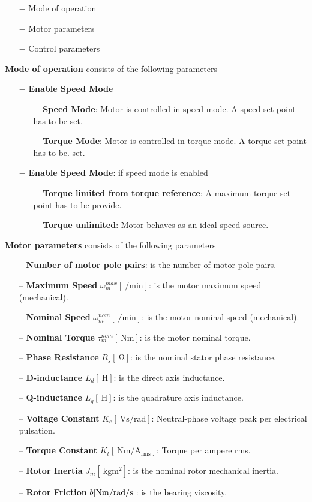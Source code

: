 \documentclass[11pt,a4paper]{article}
\numberwithin{equation}{section}
\theoremstyle{it}
\theoremstyle{definition}
\begin{document}
\begin{onehalfspace}
\begin{itemize}
	\item[$-$] Mode of operation
	\item[$-$] Motor parameters
	\item[$-$] Control parameters
\end{itemize} 

\textbf{Mode of operation} consists of the following parameters
\begin{itemize}
	\item[$-$] \textbf{Enable Speed Mode}
	\begin{itemize}
		\item[$-$] \textbf{Speed Mode}: Motor is controlled in speed mode. A speed set-point has to be set.
		\item[$-$] \textbf{Torque Mode}: Motor is controlled in torque mode. A torque set-point has to be. set.		
	\end{itemize}
	\item[$-$] \textbf{Enable Speed Mode}: if speed mode is enabled
		\begin{itemize}
			\item[$-$] \textbf{Torque limited from torque reference}: A maximum torque set-point has to be provide.
			\item[$-$] \textbf{Torque unlimited}: Motor behaves as an ideal speed source.
		\end{itemize}
\end{itemize}

\textbf{Motor parameters} consists of the following parameters
\begin{itemize}
	\item[--] \textbf{Number of motor pole pairs}: is the number of motor pole pairs.
	\item[--] \textbf{Maximum Speed} $\omega_m^{max}[\SI{}{\per\minute}]$: is the motor maximum speed (mechanical).	\item[--] \textbf{Nominal Speed} $\omega_m^{nom}[\SI{}{\per\minute}]$: is the motor nominal speed (mechanical).
	\item[--] \textbf{Nominal Torque} $\tau_m^{nom}[\SI{}{\newton\meter}]$: is the motor nominal torque.
	\item[--] \textbf{Phase Resistance} $R_{s}[\SI{}{\ohm}]$: is the nominal stator phase resistance.
	\item[--] \textbf{D-inductance} $L_{d}[\SI{}{\henry}]$: is the direct axis inductance.
	\item[--] \textbf{Q-inductance} $L_{q}[\SI{}{\henry}]$: is the quadrature axis inductance.
	\item[--] \textbf{Voltage Constant} $K_e[\SI{ }{\volt\second\per\radian}]$: Neutral-phase voltage peak per electrical pulsation.
	\item[--] \textbf{Torque Constant} $K_t[\SI{ }{\newton\meter\per\ampere_\text{rms}}]$: Torque per ampere rms.
	\item[--] \textbf{Rotor Inertia} $J_m[\SI{}{\kilo\gram\square\meter}]$: is the nominal rotor mechanical inertia.
	\item[--] \textbf{Rotor Friction} $b[\SI{}{\newton\meter\per{\radian\per\second}}]$: is the bearing viscosity.
\end{itemize}


\end{onehalfspace}
\end{document}
